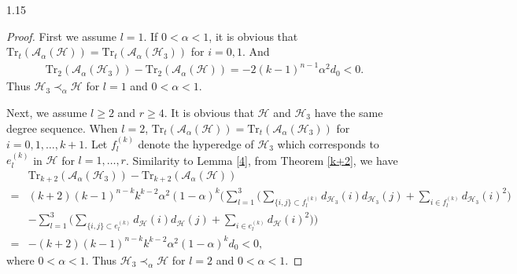 \documentclass[preprint,12pt]{elsarticle1}
\numberwithin{equation}{section}
\begin{document}
\begin{spacing}{1.15}
\begin{proof}
First we assume $l=1$. If $0<\alpha<1$, it is obvious that  $\mathrm{Tr}_t(\mathcal{A}_{\alpha}(\mathcal{H}))=\mathrm{Tr}_t(\mathcal{A}_{\alpha}(\mathcal{H}_3))$ for $i=0,1$.
And
\begin{align*}
\mathrm{Tr}_2(\mathcal{A}_{\alpha}(\mathcal{H}_3))-\mathrm{Tr}_2(\mathcal{A}_{\alpha}(\mathcal{H}))
=-2(k-1)^{n-1}\alpha^{2}d_0<0.
\end{align*}
Thus $\mathcal{H}_{3}\prec_{\alpha}\mathcal{H}$ for $l=1$ and $0<\alpha<1$.

Next, we assume $l\ge2$ and $r\ge4$. It is obvious that $\mathcal{H}$ and $\mathcal{H}_3$ have the same degree sequence.
When $l=2$, $\mathrm{Tr}_{t}(\mathcal{A}_{\alpha}(\mathcal{H}))=\mathrm{Tr}_t(\mathcal{A}_{\alpha}(\mathcal{H}_3))$ for $i=0,1,\ldots,k+1$.
Let $f_{l}^{(k)}$ denote the hyperedge of $\mathcal{H}_3$ which corresponds to $e_{l}^{(k)}$ in $\mathcal{H}$ for $l=1,\ldots,r$.
Similarity to Lemma \ref{4}, from Theorem \ref{k+2}, we have
\begin{align*}
&\mathrm{Tr}_{k+2}(\mathcal{A}_{\alpha}(\mathcal{H}_3))-\mathrm{Tr}_{k+2}(\mathcal{A}_{\alpha}(\mathcal{H}))\\
=&(k+2)(k-1)^{n-k}k^{k-2} \alpha^2(1-\alpha)^{k} \Bigg(\sum\limits_{l=1}^{3}\bigg(\sum\limits_{\{i,j\}\subset f^{(k)}_l}d_{\mathcal{H}_3}(i)d_{\mathcal{H}_3}(j)+\sum\limits_{i\in f^{(k)}_l}d_{\mathcal{H}_3}(i)^{2}\bigg) \\
&-\sum\limits_{l=1}^{3}\bigg(\sum\limits_{\{i,j\}\subset e^{(k)}_l}d_{\mathcal{H}}(i)d_{\mathcal{H}}(j)+\sum\limits_{i\in e^{(k)}_l}d_{\mathcal{H}}(i)^{2}\bigg)\Bigg) \\
=&-(k+2)(k-1)^{n-k}k^{k-2}\alpha^{2}(1-\alpha)^{k}d_0<0,
\end{align*}
where $0<\alpha<1$.
Thus $\mathcal{H}_{3}\prec_{\alpha}\mathcal{H}$ for $l=2$ and $0<\alpha<1$.


\end{proof}
\end{spacing}
\end{document}

